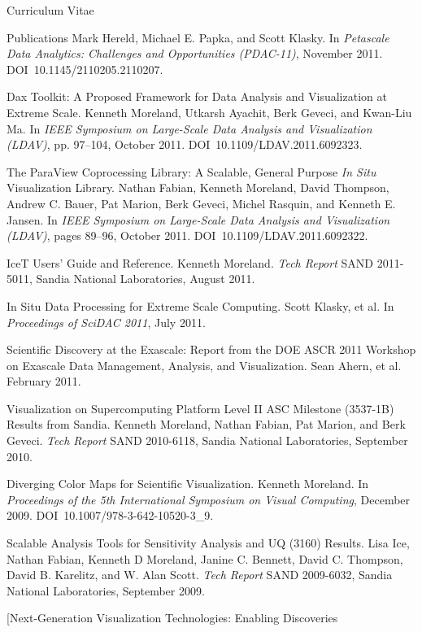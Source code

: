 \documentclass{article}
\begin{document}
\begin{cv}{Curriculum Vitae}
\begin{cvlist}{Publications}
      Mark Hereld, Michael E. Papka, and Scott Klasky. In \emph{Petascale
        Data Analytics: Challenges and Opportunities (PDAC-11)}, November
      2011. DOI~10.1145/2110205.2110207.
    \item[Dax Toolkit: A Proposed Framework for Data Analysis and
      Visualization at] Extreme Scale. Kenneth Moreland, Utkarsh Ayachit,
      Berk Geveci, and Kwan-Liu Ma. In \emph{IEEE Symposium on Large-Scale
        Data Analysis and Visualization (LDAV)}, pp. 97--104, October
      2011. DOI~10.1109/LDAV.2011.6092323.
    \item[The ParaView Coprocessing Library: A Scalable, General Purpose
      \emph{In Situ}] Visualization Library. Nathan Fabian, Kenneth
      Moreland, David Thompson, Andrew C. Bauer, Pat Marion, Berk Geveci,
      Michel Rasquin, and Kenneth E. Jansen. In \emph{IEEE Symposium on
        Large-Scale Data Analysis and Visualization (LDAV)}, pages 89--96,
      October 2011. DOI~10.1109/LDAV.2011.6092322.
    \item[IceT Users' Guide and Reference.] Kenneth Moreland. \emph{Tech
      Report} SAND 2011-5011, Sandia National Laboratories, August 2011.
    \item[In Situ Data Processing for Extreme Scale Computing.] Scott
      Klasky, et al. In \emph{Proceedings of SciDAC 2011}, July 2011.
    \item[Scientific Discovery at the Exascale: Report from the DOE ASCR
      2011] Workshop on Exascale Data Management, Analysis, and
      Visualization. Sean Ahern, et al. February 2011.
    \item[Visualization on Supercomputing Platform Level II ASC Milestone]
      (3537-1B) Results from Sandia. Kenneth Moreland, Nathan Fabian, Pat
      Marion, and Berk Geveci. \emph{Tech Report} SAND 2010-6118, Sandia
      National Laboratories, September 2010.
    \item[Diverging Color Maps for Scientific Visualization.] Kenneth
      Moreland. In \emph{Proceedings of the 5th International Symposium on
        Visual Computing}, December 2009. DOI~10.1007/978-3-642-10520-3\_9.
    \item[Scalable Analysis Tools for Sensitivity Analysis and UQ (3160)
      Results.] Lisa Ice, Nathan Fabian, Kenneth D Moreland, Janine
      C. Bennett, David C. Thompson, David B. Karelitz, and W. Alan
      Scott. \emph{Tech Report} SAND 2009-6032, Sandia National
      Laboratories, September 2009.
    \item[Next-Generation Visualization Technologies: Enabling Discoveries

\end{cvlist}
\end{cv}
\end{document}
